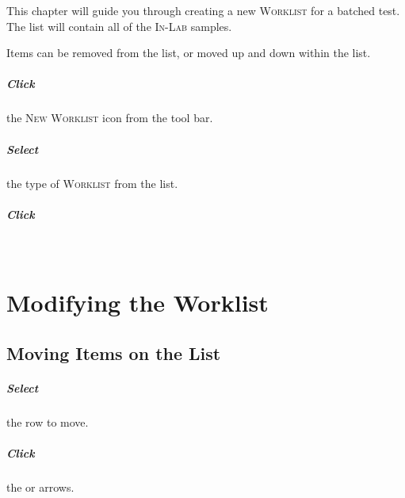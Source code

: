 This chapter will guide you through creating a new \textsc{Worklist} for a batched test. The list will contain all of the \textsc{In-Lab} samples.

Items can be removed from the list, or moved up and down within the list.

\paragraph{Click} the \textsc{New Worklist}  icon from the tool bar.\\


\paragraph{Select} the type of \textsc{Worklist} from the list.\\


\paragraph{Click} \\



\chapter{Modifying the Worklist}

\section{Moving Items on the List}

\paragraph{Select} the row to move.\\


\paragraph{Click} the  or  arrows.\\

